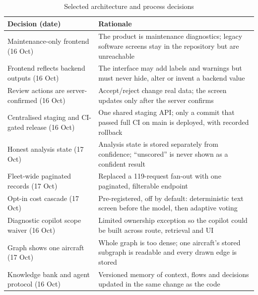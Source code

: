 \begin{table}[H]
\centering
\caption{Selected architecture and process decisions}
\label{tab:decisions}
\small
\begin{tabularx}{\textwidth}{@{}>{\raggedright\arraybackslash}p{} L@{}}
\toprule
Decision (date) & Rationale \\
\midrule
Maintenance-only frontend (16 Oct) & The product is maintenance diagnostics; legacy software screens stay in the repository but are unreachable \\
Frontend reflects backend outputs (16 Oct) & The interface may add labels and warnings but must never hide, alter or invent a backend value \\
Review actions are server-confirmed (16 Oct) & Accept/reject change real data; the screen updates only after the server confirms \\
Centralised staging and CI-gated release (16 Oct) & One shared staging API; only a commit that passed full CI on main is deployed, with recorded rollback \\
Honest analysis state (17 Oct) & Analysis state is stored separately from confidence; ``unscored'' is never shown as a confident result \\
Fleet-wide paginated records (17 Oct) & Replaced a 119-request fan-out with one paginated, filterable endpoint \\
Opt-in cost cascade (17 Oct) & Pre-registered, off by default: deterministic text screen before the model, then adaptive voting \\
Diagnostic copilot scope waiver (16 Oct) & Limited ownership exception so the copilot could be built across route, retrieval and UI \\
Graph shows one aircraft (17 Oct) & Whole graph is too dense; one aircraft's stored subgraph is readable and every drawn edge is stored \\
Knowledge bank and agent protocol (16 Oct) & Versioned memory of context, flows and decisions updated in the same change as the code \\
\bottomrule
\end{tabularx}
\end{table}
